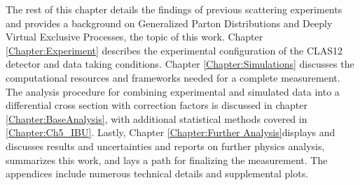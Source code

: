 The rest of this chapter details the findings of previous scattering experiments and provides a background on Generalized Parton Distributions and Deeply Virtual Exclusive Processes, the topic of this work. Chapter \ref{Chapter:Experiment} describes the experimental configuration of the CLAS12 detector and data taking conditions. Chapter \ref{Chapter:Simulations} discusses the computational resources and frameworks needed for a complete \xsec measurement. The analysis procedure for combining experimental and simulated data into a differential cross section with correction factors is discussed in chapter \ref{Chapter:BaseAnalysis}, with additional statistical methods covered in \ref{Chapter:Ch5_IBU}. Lastly, Chapter \ref{Chapter:Further Analysis}displays and discusses results and uncertainties and reports on further physics analysis, summarizes this work, and lays a path for finalizing the measurement. The appendices include numerous technical details and supplemental plots. 


\clearpage



         
 

